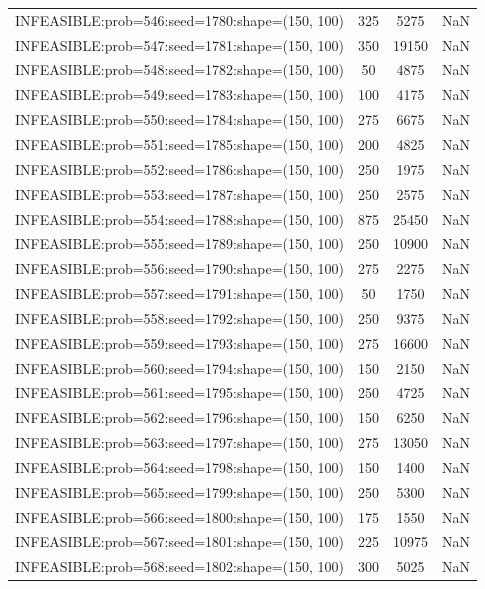 \begin{longtable}{lccc}
INFEASIBLE:prob=546:seed=1780:shape=(150, 100) &      325 &  5275 &    NaN \\
INFEASIBLE:prob=547:seed=1781:shape=(150, 100) &      350 & 19150 &    NaN \\
INFEASIBLE:prob=548:seed=1782:shape=(150, 100) &       50 &  4875 &    NaN \\
INFEASIBLE:prob=549:seed=1783:shape=(150, 100) &      100 &  4175 &    NaN \\
INFEASIBLE:prob=550:seed=1784:shape=(150, 100) &      275 &  6675 &    NaN \\
INFEASIBLE:prob=551:seed=1785:shape=(150, 100) &      200 &  4825 &    NaN \\
INFEASIBLE:prob=552:seed=1786:shape=(150, 100) &      250 &  1975 &    NaN \\
INFEASIBLE:prob=553:seed=1787:shape=(150, 100) &      250 &  2575 &    NaN \\
INFEASIBLE:prob=554:seed=1788:shape=(150, 100) &      875 & 25450 &    NaN \\
INFEASIBLE:prob=555:seed=1789:shape=(150, 100) &      250 & 10900 &    NaN \\
INFEASIBLE:prob=556:seed=1790:shape=(150, 100) &      275 &  2275 &    NaN \\
INFEASIBLE:prob=557:seed=1791:shape=(150, 100) &       50 &  1750 &    NaN \\
INFEASIBLE:prob=558:seed=1792:shape=(150, 100) &      250 &  9375 &    NaN \\
INFEASIBLE:prob=559:seed=1793:shape=(150, 100) &      275 & 16600 &    NaN \\
INFEASIBLE:prob=560:seed=1794:shape=(150, 100) &      150 &  2150 &    NaN \\
INFEASIBLE:prob=561:seed=1795:shape=(150, 100) &      250 &  4725 &    NaN \\
INFEASIBLE:prob=562:seed=1796:shape=(150, 100) &      150 &  6250 &    NaN \\
INFEASIBLE:prob=563:seed=1797:shape=(150, 100) &      275 & 13050 &    NaN \\
INFEASIBLE:prob=564:seed=1798:shape=(150, 100) &      150 &  1400 &    NaN \\
INFEASIBLE:prob=565:seed=1799:shape=(150, 100) &      250 &  5300 &    NaN \\
INFEASIBLE:prob=566:seed=1800:shape=(150, 100) &      175 &  1550 &    NaN \\
INFEASIBLE:prob=567:seed=1801:shape=(150, 100) &      225 & 10975 &    NaN \\
INFEASIBLE:prob=568:seed=1802:shape=(150, 100) &      300 &  5025 &    NaN \\

\end{longtable}
